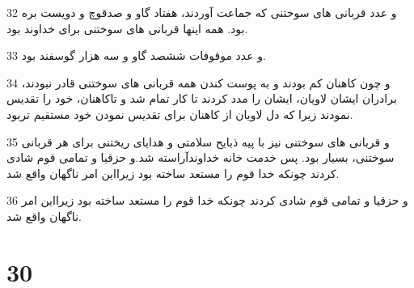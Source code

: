 \par 32 و عدد قربانی های سوختنی که جماعت آوردند، هفتاد گاو و صدقوچ و دویست بره بود. همه اینها قربانی های سوختنی برای خداوند بود.
\par 33 و عدد موقوفات ششصد گاو و سه هزار گوسفند بود.
\par 34 و چون کاهنان کم بودند و به پوست کندن همه قربانی های سوختنی قادر نبودند، برادران ایشان لاویان، ایشان را مدد کردند تا کار تمام شد و تاکاهنان، خود را تقدیس نمودند زیرا که دل لاویان از کاهنان برای تقدیس نمودن خود مستقیم تربود.
\par 35 و قربانی های سوختنی نیز با پیه ذبایح سلامتی و هدایای ریختنی برای هر قربانی سوختنی، بسیار بود. پس خدمت خانه خداوندآراسته شد.و حزقیا و تمامی قوم شادی کردند چونکه خدا قوم را مستعد ساخته بود زیرااین امر ناگهان واقع شد.
\par 36 و حزقیا و تمامی قوم شادی کردند چونکه خدا قوم را مستعد ساخته بود زیرااین امر ناگهان واقع شد.
 
\chapter{30}

